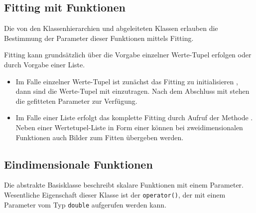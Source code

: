 \subsection{Fitting mit Funktionen}
\hypertarget{FittingWithFunctions}{}

Die von den Klassenhierarchien
 und  abgeleiteten 
Klassen erlauben die Bestimmung der Parameter dieser Funktionen mittels Fitting.

Fitting kann grundsätzlich über die Vorgabe einzelner Werte-Tupel erfolgen
oder durch Vorgabe einer Liste.
\begin{itemize}
\item Im Falle einzelner Werte-Tupel ist zunächst
das Fitting zu initialisieren , 
dann sind die Werte-Tupel mit  einzutragen. 
Nach dem Abschluss mit  stehen die
gefitteten Parameter zur Verfügung.
\item Im Falle einer Liste erfolgt das komplette Fitting durch Aufruf der
 Methode . Neben einer Wertetupel-Liste 
in Form einer  können bei zweidimensionalen Funktionen auch 
Bilder zum Fitten übergeben werden.
\end{itemize}


\subsection{Eindimensionale Funktionen}
\label{Function}
\hypertarget{Function}{}
Die abstrakte Basisklasse  beschreibt skalare 
Funktionen mit einem Parameter. Wesentliche Eigenschaft dieser
Klasse ist der \verb+operator()+, der mit einem Parameter vom Typ
\verb+double+ aufgerufen werden kann. 




